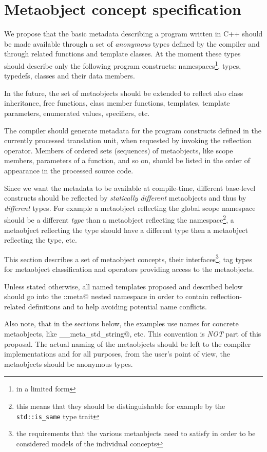 \section{Metaobject concept specification}
\label{section-current-Concepts}

We propose that the basic metadata describing a program written
in C++ should be made available through a set of {\em anonymous} types
defined by the compiler and through related functions and template classes.
At the moment these types should describe only the following program
constructs: namespaces\footnote{in a limited form}, types, typedefs,
classes and their data members.

In the future, the set of metaobjects should be extended to reflect also
class inheritance, free functions, class member functions, templates,
template parameters, enumerated values, specifiers, etc.

The compiler should generate metadata for the program constructs defined
in the currently processed translation unit, when requested by invoking
the reflection operator. Members of ordered sets (sequences) of metaobjects,
like scope members, parameters of a function, and so on, should be listed
in the order of appearance in the processed source code.

Since we want the metadata to be available at compile-time,
different base-level constructs should be reflected by
{\em statically different} metaobjects and thus by {\em different} types.
For example a metaobject reflecting the global scope namespace should
be a different {\em type} than a metaobject reflecting the \verb@std@
namespace\footnote{this means that they should be distinguishable for
example by the \texttt{std::is\_same} type trait},
a metaobject reflecting the \verb@int@ type should
have a different type then a metaobject reflecting the \verb@double@
type, etc.

This section describes a set of metaobject concepts,
their interfaces\footnote{the requirements that the various metaobjects
need to satisfy in order to be considered models of the individual
concepts},
tag types for metaobject classification and operators providing access to the metaobjects.

Unless stated otherwise, all named templates proposed and described below should
go into the \verb@std::meta@ nested namespace in order to contain reflection-related
definitions and to help avoiding potential name conflicts.

Also note, that in the sections below, the examples use names for concrete
metaobjects, like \verb@__meta_std_string@, etc. This convention
is {\em NOT} part of this proposal. The actual naming of the metaobjects
should be left to the compiler implementations and for all purposes,
from the user's point of view, the metaobjects should be anonymous types.

